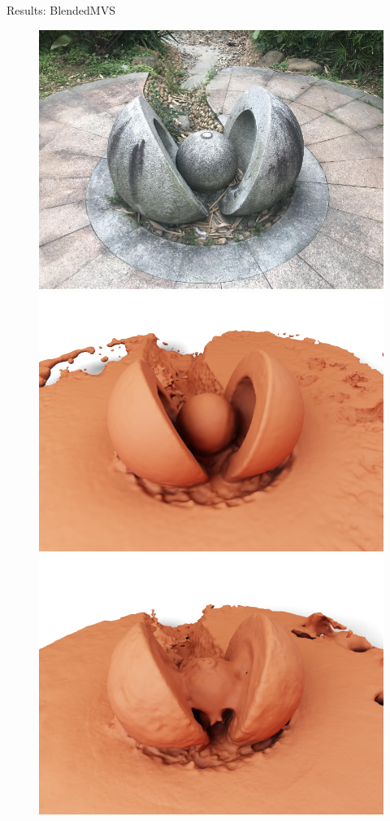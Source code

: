 \documentclass[10pt]{beamer}
\begin{document}
\begin{frame}{Results: \alert{BlendedMVS}}
\begin{figure}
        \includegraphics[width=0.3\linewidth]{figures/results/stone.png}
        \includegraphics[width=0.3\linewidth]{figures/results/stone_ours.png}
        \includegraphics[width=0.3\linewidth]{figures/results/stone_neuralangelo.png}
    \end{figure}
\end{frame}
\end{document}
